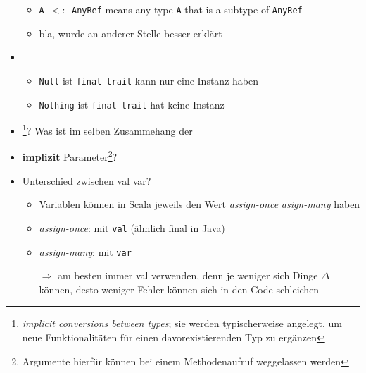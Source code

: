 \begin{itemize}
  \begin{itemize}
    \item \texttt{A $<:$ AnyRef} means any type \texttt{A} that is a 
    subtype of \texttt{AnyRef}
    \item bla, wurde an anderer Stelle besser erklärt
  \end{itemize}


  \item {}

  \begin{itemize}
    \item \texttt{Null} ist \texttt{final trait} \und kann nur eine 
    Instanz haben
    \item \texttt{Nothing} ist \texttt{final trait} \und hat keine Instanz
  \end{itemize}

  \item {}\footnote{\textit{implicit conversions between
  types}; sie werden typischerweise angelegt, um neue Funktionalitäten
  für einen davorexistierenden Typ zu ergänzen}? Was ist im selben 
  Zusammehang der 
  \item \textbf{implizit} Parameter\footnote{Argumente hierfür können 
  bei einem Methodenaufruf weggelassen werden}?
  \item Unterschied zwischen val \und var?
  \begin{itemize}
    \item Variablen können in Scala jeweils den Wert 
    \textit{assign-once} \oder \textit{asign-many} haben
    \item \textit{assign-once}: mit \texttt{val} (ähnlich final
    in Java)
    \item \textit{assign-many}: mit \texttt{var}
    
    $\Rightarrow$ am besten immer val verwenden, denn je weniger
    sich Dinge $\Delta$ können, desto weniger Fehler können sich
    in den Code schleichen
  \end{itemize}
  

\end{itemize}
